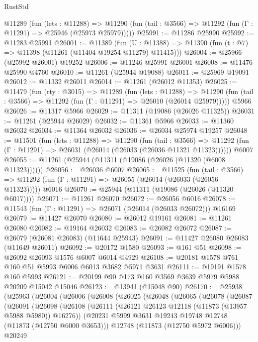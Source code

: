\begin{lexlean}{RustStd}
\begin{coremodule}
    @11289
      (fun (lets : @11288) =>
      @11290 (fun (tail : @3566) => @11292 (fun (Γ : @11291) => @25946 (@25973 @25979)))))
@25991 := @11286 @25990
@25992 := @11283 @25991
@26001 := @11389
    (fun (U : @11388) => @11390 (fun (t : @7) => @11398 (@11261 (@11404 @19254 @11279) @11415)))
@26004 := @25966 (@25992 @26001) @19252
@26006 := @11246 @25991 @26001
@26008 := @11476 @25990 @4760
@26010 := @11261 (@25944 @19088)
@26011 := @25969 @19091
@26012 := @11332 @26011
@26014 := @11261 (@26012 @11353)
@26025 := @11479
    (fun (rty : @3015) =>
    @11289
      (fun (lets : @11288) =>
      @11290 (fun (tail : @3566) => @11292 (fun (Γ : @11291) => @26010 (@26014 @25979)))))
    @5966
@26026 := @11317 @5966
@26029 := @11311 (@19086 (@26026 @11325))
@26031 := @11261 (@25944 @26029)
@26032 := @11361 @5966
@26033 := @11360 @26032
@26034 := @11364 @26032
@26036 := @26034 @25974 @19257
@26048 := @11501
    (fun (lets : @11288) =>
    @11290
      (fun (tail : @3566) =>
      @11292 (fun (Γ : @11291) => @26031 (@26014 (@26033 (@26036 @11321 @11323))))))
    @6007
@26055 := @11261 (@25944 (@11311 (@19086 (@26026 (@11320 (@6008 @11323))))))
@26056 := @26036 @6007
@26065 := @11525
    (fun (tail : @3566) => @11292 (fun (Γ : @11291) => @26055 (@26014 (@26033 (@26056 @11323)))))
    @6016
@26070 := @25944 (@11311 (@19086 (@26026 (@11320 @6017))))
@26071 := @11261 @26070
@26072 := @26056 @6016
@26078 := @11543 (fun (Γ : @11291) => @26071 (@26014 (@26033 @26072))) @16169
@26079 := @11427 @26070
@26080 := @26012 @19161
@26081 := @11261 @26080
@26082 := @19164 @26032
@26083 := @26082 @26072
@26087 := @26079 (@26081 @26083) (@11644 @25943)
@26091 := @11427 @26080 @26083 (@11649 @26011)
@26092 := @20172 @1580
@26093 := @161 @51
@26098 := @26092 @26093 @1576 @6007 @6014 @4929
@26108 := @20181 @1578 @761 @160 @51 @5993 @6006 @6013 @3682 @5971 @3631
@26111 := @19191 @1578 @160 @5993
@26121 := @20199 @90 @173 @160 @3569 @3639 @5979 @5988 @20209 @15042 @15046
@26123 := @13941 (@15048 @90)
@26170 := @25938
    (@25963
      (@26004
        (@26006
          (@26008
            (@26025
              (@26048
                (@26065
                  (@26078
                    (@26087
                      (@26091
                        (@26098
                          (@26108
                            (@26111 (@26121 @26123 @12118 (@11873 (@13957 @5988 @5980)) @16276))
                            (@20231 @5999 @3631 @19243 @19748 @12748 (@11873 (@12750 @6000 @3653)))
                            @12748
                            (@11873 (@12750 @5972 @6006)))
                          @20249

\end{coremodule}
\end{lexlean}
